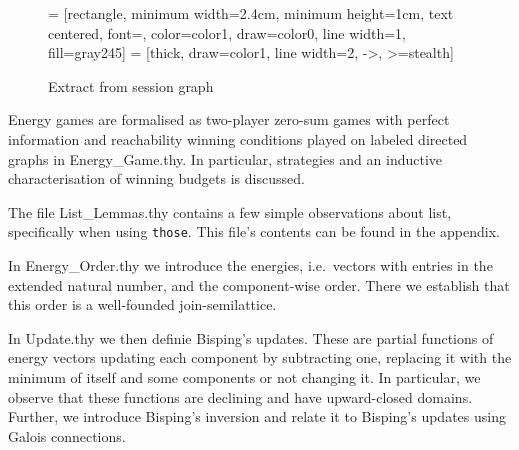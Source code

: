 \begin{figure}[H]
\begin{center}


 = [rectangle, minimum width=2.4cm, minimum height=1cm, text centered, font=\normalsize, color=color1, draw=color0, line width=1, fill=gray245]
 = [thick, draw=color1, line width=2, ->, >=stealth]

\end{center}
\caption{Extract from session graph}\label{fig:sessiongraph}
\end{figure}

Energy games are formalised as two-player zero-sum games with perfect information and reachability winning conditions played on labeled directed graphs in Energy\_Game.thy. 
In particular, strategies and an inductive characterisation of winning budgets is discussed.

The file List\_Lemmas.thy contains a few simple observations about list, specifically when using \texttt{those}. This file's contents can be found in the appendix.

In Energy\_Order.thy we introduce the energies, i.e.\ vectors with entries in the extended natural number, and the component-wise order. There we establish that this order is a well-founded join-semilattice. 

In Update.thy we then definie Bisping's updates. These are partial functions of energy vectors updating each component by subtracting one, replacing it with the minimum of itself and some components or not changing it. In particular, we observe that these functions are declining and have upward-closed domains.
Further, we introduce Bisping's inversion and relate it to Bisping's updates using Galois connections. 


